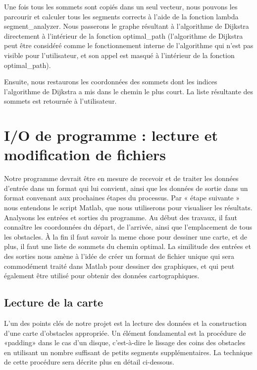 \documentclass[12pt]{article}
\begin{document}
	Une fois tous les sommets sont copiés dans un seul vecteur, nous pouvons les parcourir et calculer tous les segments corrects à l'aide de la fonction lambda segment\_analyzer. Nous passerons le graphe résultant à l'algorithme de Dijkstra directement à l'intérieur de la fonction optimal\_path (l'algorithme de Dijkstra peut être considéré comme le fonctionnement interne de l'algorithme qui n'est pas visible pour l'utilisateur, et son appel est masqué à l'intérieur de la fonction optimal\_path).
	
	Ensuite, nous restaurons les coordonnées des sommets dont les indices l'algorithme de Dijkstra a mis dans le chemin le plus court. La liste résultante des sommets est retournée à l'utilisateur.
	
	
	
	\section{I/O de programme : lecture et modification de fichiers}
	
	Notre programme devrait être en mesure de recevoir et de traiter les données d'entrée dans un format qui lui convient, ainsi que les données de sortie dans un format convenant aux prochaines étapes du processus. Par « étape suivante » nous entendons le script Matlab, que nous utiliserons pour visualiser les résultats. Analysons les entrées et sorties du programme. Au début des travaux, il faut connaître les coordonnées du départ, de l'arrivée, ainsi que l'emplacement de tous les obstacles. À la fin il faut savoir la meme chose pour dessiner une carte, et de plus, il faut une liste de sommets du chemin optimal. La similitude des entrées et des sorties nous amène à l'idée de créer un format de fichier unique qui sera commodément traité dans Matlab pour dessiner des graphiques, et qui peut également être utilisé pour obtenir des données cartographiques.
	
	\subsection {Lecture de la carte}
	L'un des points clés de notre projet est la lecture des données et la construction d'une carte d'obstacles appropriée. Un élément fondamental est la procédure de «padding» dans le cas d'un disque, c'est-à-dire le lissage des coins des obstacles en utilisant un nombre suffisant de petits segments supplémentaires. La technique de cette procédure sera décrite plus en détail ci-dessous.
	
\end{document}
